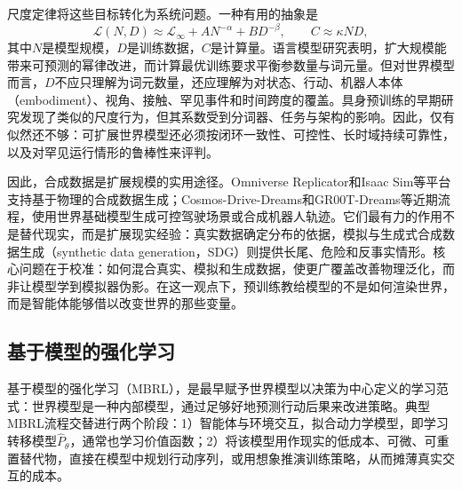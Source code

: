 尺度定律将这些目标转化为系统问题。一种有用的抽象是
\begin{equation}
\mathcal{L}(N,D)
\approx
\mathcal{L}_{\infty}
+
A N^{-\alpha}
+
B D^{-\beta},
\qquad
C \approx \kappa N D,
\end{equation}
其中$N$是模型规模，$D$是训练数据，$C$是计算量。语言模型研究表明，扩大规模能带来可预测的幂律改进，而计算最优训练要求平衡参数量与词元量\citep{kaplan2020scaling,hoffmann2022training}。但对世界模型而言，$D$不应只理解为词元数量，还应理解为对状态、行动、机器人本体（embodiment）、视角、接触、罕见事件和时间跨度的覆盖。具身预训练的早期研究发现了类似的尺度行为，但其系数受到分词器、任务与架构的影响\citep{pearce2024scaling}。因此，仅有似然还不够：可扩展世界模型还必须按闭环一致性、可控性、长时域持续可靠性，以及对罕见运行情形的鲁棒性来评判。

因此，合成数据是扩展规模的实用途径。Omniverse Replicator和Isaac Sim等平台支持基于物理的合成数据生成；Cosmos-Drive-Dreams和GR00T-Dreams等近期流程，使用世界基础模型生成可控驾驶场景或合成机器人轨迹\citep{nvidia2022replicator,nvidia2025cosmos,nvidia2025grootdreams}。它们最有力的作用不是替代现实，而是扩展现实经验：真实数据确定分布的依据，模拟与生成式合成数据生成（synthetic data generation，SDG）则提供长尾、危险和反事实情形。核心问题在于校准：如何混合真实、模拟和生成数据，使更广覆盖改善物理泛化，而非让模型学到模拟器伪影。在这一观点下，预训练教给模型的不是如何渲染世界，而是智能体能够借以改变世界的那些变量。

\subsection{基于模型的强化学习}
\label{sec:mbrl}
基于模型的强化学习（MBRL）\citep{moerland2022modelbasedreinforcementlearningsurvey}，是最早赋予世界模型以决策为中心定义的学习范式：世界模型是一种内部模型，通过足够好地预测行动后果来改进策略。典型MBRL流程交替进行两个阶段：1）智能体与环境交互，拟合动力学模型，即学习转移模型$\widehat P_\theta$，通常也学习价值函数；2）将该模型用作现实的低成本、可微、可重置替代物，直接在模型中规划行动序列，或用想象推演训练策略，从而摊薄真实交互的成本。

